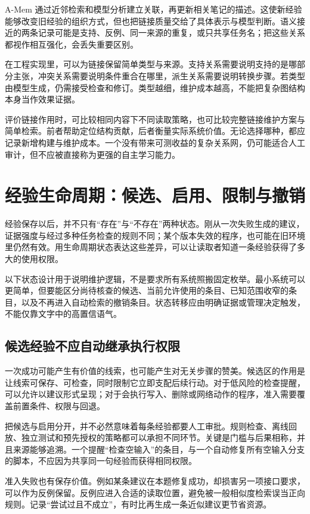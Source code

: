 A-Mem 通过近邻检索和模型分析建立关联，再更新相关笔记的描述\cite{amem-2502}。这使新经验能够改变旧经验的组织方式，但也把链接质量交给了具体表示与模型判断。语义接近的两条记录可能是支持、反例、同一来源的重复，或只共享任务名；把这些关系都视作相互强化，会丢失重要区别。

在工程实现里，可以为链接保留简单类型与来源。支持关系需要说明支持的是哪部分主张，冲突关系需要说明条件重合在哪里，派生关系需要说明转换步骤。若类型由模型生成，仍需接受检查和修订。类型越细，维护成本越高，不能把复杂图结构本身当作效果证据。

评价链接作用时，可比较相同内容下不同读取策略，也可比较完整链接维护方案与简单检索。前者帮助定位结构贡献，后者衡量实际系统价值。无论选择哪种，都应记录新增构建与维护成本。一个没有带来可测收益的复杂关系网，仍可能适合人工审计，但不应被直接称为更强的自主学习能力。

\section{经验生命周期：候选、启用、限制与撤销}
\label{sec:ch05-lifecycle}

经验保存以后，并不只有“存在”与“不存在”两种状态。刚从一次失败生成的建议，证据强度与经过多种任务检查的规则不同；某个版本失效的程序，也可能在旧环境里仍然有效。用生命周期状态表达这些差异，可以让读取者知道一条经验获得了多大的使用权限。

以下状态设计用于说明维护逻辑，不是要求所有系统照搬固定枚举。最小系统可以更简单，但要能区分尚待核查的候选、当前允许使用的条目、已知范围收窄的条目，以及不再进入自动检索的撤销条目。状态转移应由明确证据或管理决定触发，不能仅靠文字中的高置信语气。

\subsection{候选经验不应自动继承执行权限}

一次成功可能产生有价值的线索，也可能产生对无关步骤的赞美。候选区的作用是让线索可保存、可检查，同时限制它立即支配后续行动。对于低风险的检查提醒，可以允许以建议形式呈现；对于会执行写入、删除或网络动作的程序，准入需要覆盖前置条件、权限与回退。

把候选与启用分开，并不必然意味着每条经验都要人工审批。规则检查、离线回放、独立测试和预先授权的策略都可以承担不同环节。关键是门槛与后果相称，并且来源能够追溯。一个提醒“检查空输入”的条目，与一个自动修复所有空输入分支的脚本，不应因为共享同一句经验而获得相同权限。

准入失败也有保存价值。例如某条建议在本题修复成功，却损害另一项接口要求，可以作为反例保留。反例应进入合适的读取位置，避免被一般相似度检索误当正向规则。记录“尝试过且不成立”，有时比再生成一条近似建议更节省资源。


